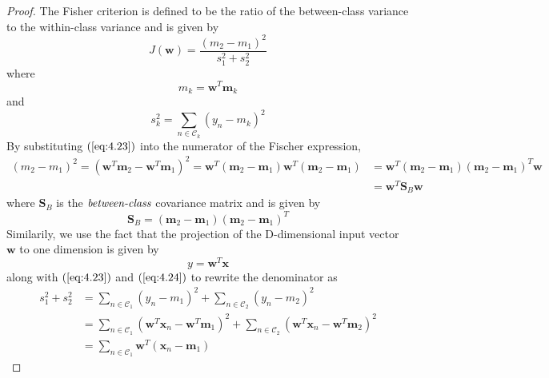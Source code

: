 \begin{proof}
    The Fisher criterion is defined to be the ratio of the between-class
    variance to the within-class variance and is given by
    \begin{equation}\label{eq:4.25}\tag{4.25}
        J(\mathbf{w}) = \frac{(m_2 - m_1)^2}{s_1^2 + s_2^2}
    \end{equation}
    where 
    \begin{equation}\label{eq:4.23}\tag{4.23}
        m_k = \mathbf{w}^T\mathbf{m}_k
    \end{equation}
    and
    \begin{equation}\label{eq:4.24}\tag{4.24}
        s_k^2 = \sum_{n \in \mathcal{C}_k} (y_n - m_k)^2
    \end{equation}
    By substituting $(\ref{eq:4.23})$ into the numerator of the Fischer expression,
    \begin{align*}
        (m_2 - m_1)^2 
        = (\mathbf{w}^T\mathbf{m}_2 - \mathbf{w}^T\mathbf{m}_1)^2
        = \mathbf{w}^T(\mathbf{m}_2 - \mathbf{m}_1)\mathbf{w}^T(\mathbf{m}_2 - \mathbf{m}_1)
        &= \mathbf{w}^T(\mathbf{m}_2 - \mathbf{m}_1)(\mathbf{m}_2 - \mathbf{m}_1)^T\mathbf{w} \\
        &= \mathbf{w}^T\mathbf{S}_B\mathbf{w}
    \end{align*}
    where $\mathbf{S}_B$ is the $\emph{between-class}$ covariance matrix and is given by
    \begin{equation}\label{eq:4.27}\tag{4.27}
        \mathbf{S}_B = (\mathbf{m}_2 - \mathbf{m}_1)(\mathbf{m}_2 - \mathbf{m}_1)^T
    \end{equation}
    Similarily, we use the fact that the projection of the D-dimensional input vector
    $\mathbf{w}$ to one dimension is given by
    \begin{equation}\label{eq:4.20}\tag{4.20}
        y = \mathbf{w}^T\mathbf{x}
    \end{equation}
    along with $(\ref{eq:4.23})$ and $(\ref{eq:4.24})$ to rewrite the denominator as 
    \begin{align*}
        s_1^2 + s_2^2
        &= \sum_{n \in \mathcal{C}_1} (y_n - m_1)^2 + \sum_{n \in \mathcal{C}_2} (y_n - m_2)^2 \\
        &= \sum_{n \in \mathcal{C}_1} (\mathbf{w}^T\mathbf{x}_n - \mathbf{w}^T\mathbf{m}_1)^2 
            + \sum_{n \in \mathcal{C}_2} (\mathbf{w}^T\mathbf{x}_n - \mathbf{w}^T\mathbf{m}_2)^2 \\
        &= \sum_{n \in \mathcal{C}_1} \mathbf{w}^T(\mathbf{x}_n - \mathbf{m}_1)

\end{align*}
\end{proof}
